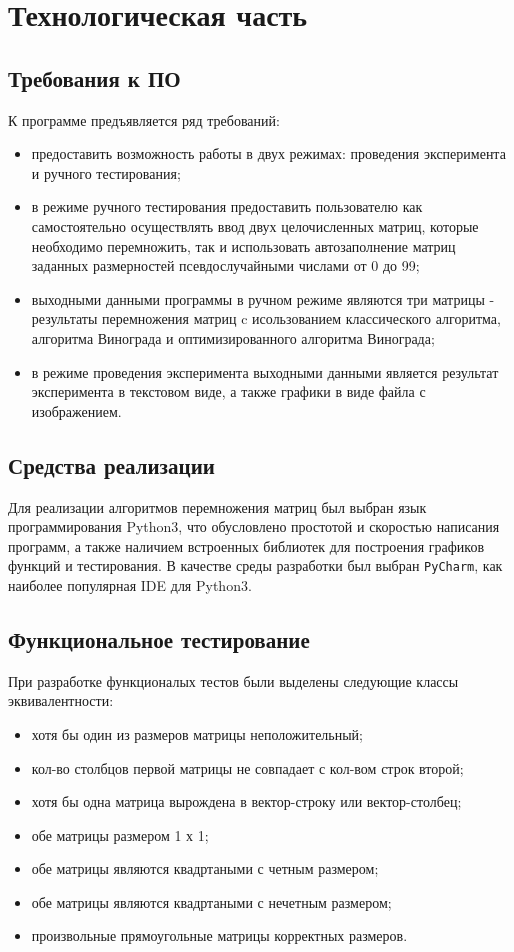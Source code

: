 \chapter{Технологическая часть}

\section{Требования к ПО}
К программе предъявляется ряд требований:
\begin{itemize}
    \item предоставить возможность работы в двух режимах: проведения эксперимента и ручного тестирования;
    \item в режиме ручного тестирования предоставить пользователю как самостоятельно осуществлять ввод двух целочисленных матриц, которые 
    необходимо перемножить, так и использовать автозаполнение матриц заданных размерностей псевдослучайными числами от 0 до 99;
	\item выходными данными программы в ручном режиме являются три матрицы - результаты перемножения матриц c исользованием классического алгоритма, алгоритма
    Винограда и оптимизированного алгоритма Винограда;
    \item в режиме проведения эксперимента выходными данными является результат эксперимента в текстовом виде, а также графики в виде файла с изображением.
\end{itemize}

\section{Средства реализации}
Для реализации алгоритмов перемножения матриц был выбран язык программирования Python3\cite{python}, что обусловлено простотой 
и скоростью написания программ, а также наличием встроенных библиотек для построения графиков функций и тестирования. 
В качестве среды разработки был выбран \texttt{PyCharm}\cite{pycharm}, как наиболее популярная IDE для Python3. 

\section{Функциональное тестирование}

При разработке функционалых тестов были выделены следующие классы эквивалентности:

\begin{itemize}
    \item хотя бы один из размеров матрицы неположительный;
    \item кол-во столбцов первой матрицы не совпадает с кол-вом строк второй;
    \item хотя бы одна матрица вырождена в вектор-строку или вектор-столбец;
    \item обе матрицы размером 1 х 1;
    \item обе матрицы являются квадртаными с четным размером;
    \item обе матрицы являются квадртаными с нечетным размером;
    \item произвольные прямоугольные матрицы корректных размеров.
\end{itemize}


